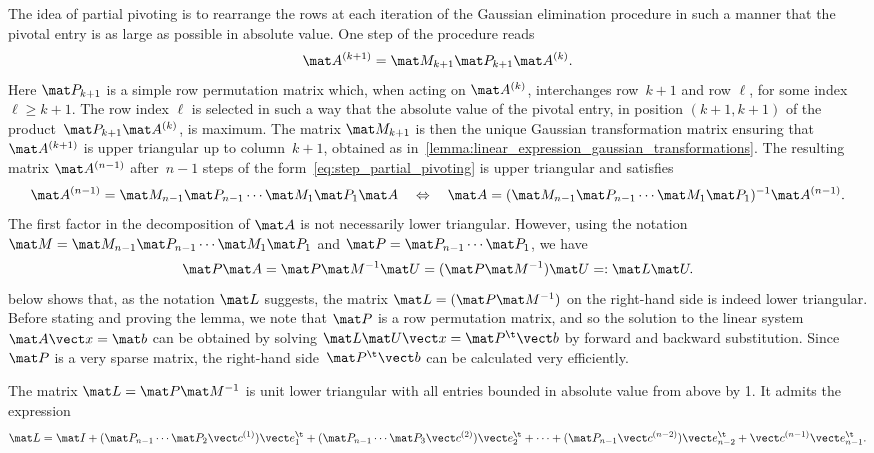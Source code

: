 The idea of partial pivoting is to rearrange the rows at each iteration of the Gaussian elimination procedure in such a manner that
the pivotal entry is as large as possible in absolute value.
One step of the procedure reads
\begin{equation}
    \label{eq:step_partial_pivoting}
    \mat A^{(k+1)} = \mat M_{k+1} \mat P_{k+1} \mat A^{(k)}.
\end{equation}
Here $\mat P_{k+1}$ is a simple row permutation matrix which,
when acting on $\mat A^{(k)}$,
interchanges row~$k+1$ and row $\ell$,
for some index $\ell \geq k+1$.
The row index $\ell$ is selected in such a way that the absolute value of the pivotal entry,
in position $(k+1, k+1)$ of the product~$\mat P_{k+1} \mat A^{(k)}$, is maximum.
The matrix $\mat M_{k+1}$ is then the unique Gaussian transformation matrix ensuring that~%
$\mat A^{(k+1)}$ is upper triangular up to column~$k+1$,
obtained as in~\cref{lemma:linear_expression_gaussian_transformations}.
The resulting matrix $\mat A^{(n-1)}$ after~$n-1$ steps of the form~\eqref{eq:step_partial_pivoting} is upper triangular and satisfies
\[
    \mat A^{(n-1)} = \mat M_{n-1} \mat P_{n-1} \dotsb \mat M_{1} \mat P_{1} \mat A
    \quad \Leftrightarrow \quad
     \mat A = (\mat M_{n-1} \mat P_{n-1} \dotsb \mat M_{1} \mat P_{1})^{-1} \mat A^{(n-1)}.
\]
The first factor in the decomposition of $\mat A$ is not necessarily lower triangular.
However, using the notation $\mat M = \mat M_{n-1} \mat P_{n-1} \dotsb \mat M_{1} \mat P_{1}$ and $\mat P = \mat P_{n-1} \dotsb \mat P_{1}$,
we have
\begin{equation}
    \label{eq:plu_decomposition}
    \mat P \mat A = \mat P \mat M^{-1} \mat U = (\mat P \mat M^{-1}) \mat U =: \mat L \mat U.
\end{equation}
 below shows that,
as the notation $\mat L$ suggests,
the matrix $\mat L = (\mat P \mat M^{-1})$ on the right-hand side is indeed lower triangular.
Before stating and proving the lemma,
we note that $\mat P$ is a row permutation matrix,
and so the solution to the linear system $\mat A \vect x = \mat b$ can be obtained by solving $\mat L \mat U \vect x = \mat P^\t \vect b$
by forward and backward substitution.
Since $\mat P$ is a very sparse matrix,
the right-hand side~$\mat P^\t \vect b$ can be calculated very efficiently.
\begin{lemma}
    \label{lemma:linear_matrix_l_pivoting}
    The matrix $\mat L = \mat P \mat M^{-1}$ is unit lower triangular
    with all entries bounded in absolute value from above by 1.
    It admits the expression
    \[
        \mat L
        = \mat I
        + (\mat P_{n-1} \dotsb \mat P_{2} \vect c^{(1)}) \vect e_{1}^\t
        + (\mat P_{n-1} \dotsb \mat P_{3} \vect c^{(2)}) \vect e_{2}^\t
        + \dotsb
        + (\mat P_{n-1} \vect c^{(n-2)}) \vect e_{n-2}^\t
        + \vect c^{(n-1)} \vect e_{n-1}^\t.
    \]
\end{lemma}
